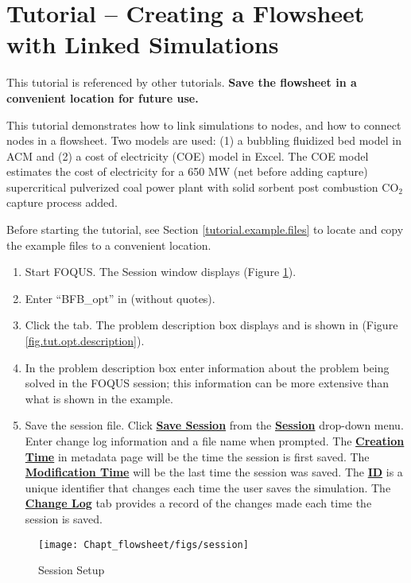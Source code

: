 \section{Tutorial -- Creating a Flowsheet with Linked Simulations}\label{tutorial.sim.flowsheet}


This tutorial is referenced by other tutorials. \textbf{Save the flowsheet in a convenient location for future use.} 

This tutorial demonstrates how to link simulations to nodes, and how to connect nodes in a flowsheet.
Two models are used: (1) a bubbling fluidized bed model in ACM and (2) a cost of electricity (COE) model in Excel. The COE model estimates the cost of electricity for a 650 MW (net before adding capture) supercritical pulverized coal power plant with solid sorbent post combustion CO$_2$ capture process added.

Before starting the tutorial, see Section \ref{tutorial.example.files} to locate and copy the example files to a convenient location.

\begin{enumerate}
	\item Start FOQUS. The Session window displays (Figure \ref{fig.tut.opt.session}).
	\item Enter ``BFB\_opt'' in  (without quotes).
	\item Click the  tab. The problem description box displays and is shown in (Figure \ref{fig.tut.opt.description}).
	\item In the problem description box enter information about the problem being solved in the FOQUS session; this information can be more extensive than what is shown in the example.
	\item Save the session file. Click \textbf{\underline{Save Session}} from the \textbf{\underline{Session}} drop-down menu. Enter change log information and a file name when prompted. The \textbf{\underline{Creation Time}} in metadata page will be the time the session is first saved.  The \textbf{\underline{Modification Time}} will be the last time the session was saved. The \textbf{\underline{ID}} is a unique identifier that changes each time the user saves the simulation. The \textbf{\underline{Change Log}} tab provides a record of the changes made each time the session is saved.
\end{enumerate}

\begin{figure}[H]
	\begin{center}
		\texttt{[image: Chapt\_flowsheet/figs/session]}
		\caption{Session Setup}
		\label{fig.tut.opt.session}
	\end{center}
\end{figure}

